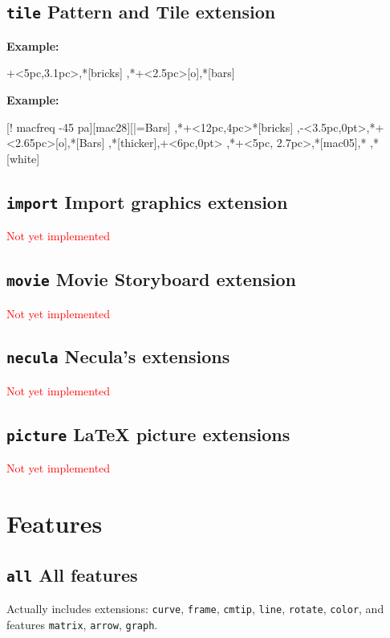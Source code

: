 \documentclass{article}
\newenvironment{code}{\par\noindent\textbf{Example:}\par\noindent}{}
\def\NotYet#1{\textcolor{red}{#1}}
\begin{document}
\subsection{\texttt{tile} Pattern and Tile extension}
\begin{code}
\xy *+<5pc,3.1pc>{},{*[bricks]\frm{**}}
 ,*+<2.5pc>[o]{},*[bars]\frm{**}
\endxy
\end{code}
\begin{code}
[! macfreq -45 pa][mac28][|=Bars]{}
,*+<12pc,4pc>{}*[bricks]\frm{**}
,-<3.5pc,0pt>,*+<2.65pc>[o]{},*[Bars]\frm{**}
,*[thicker],+<6pc,0pt>
,*+<5pc, 2.7pc>{},*[mac05]\frm{**},*\frm{-,}
,*[white]\txt\Large\bf{}
\endxy
\end{code}

\subsection{\texttt{import} Import graphics extension}
\NotYet{Not yet implemented}

\subsection{\texttt{movie} Movie Storyboard extension}
\NotYet{Not yet implemented}
\subsection{\texttt{necula} Necula's extensions}
\NotYet{Not yet implemented}
\subsection{\texttt{picture} LaTeX picture extensions}
\NotYet{Not yet implemented}
  
\section{Features}
\subsection{\texttt{all} All features}
Actually includes extensions:
\texttt{curve},
\texttt{frame},
\texttt{cmtip},
\texttt{line},
\texttt{rotate},
\texttt{color},
and features
\texttt{matrix},
\texttt{arrow},
\texttt{graph}.
\end{document}
